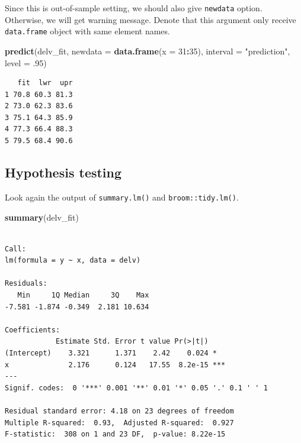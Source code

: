 \documentclass[]{book}
\newenvironment{Shaded}{\begin{snugshade}}{\end{snugshade}}
\newcommand{\DataTypeTok}[1]{\textcolor[rgb]{0.13,0.29,0.53}{#1}}
\newcommand{\DecValTok}[1]{\textcolor[rgb]{0.00,0.00,0.81}{#1}}
\newcommand{\FloatTok}[1]{\textcolor[rgb]{0.00,0.00,0.81}{#1}}
\newcommand{\KeywordTok}[1]{\textcolor[rgb]{0.13,0.29,0.53}{\textbf{#1}}}
\newcommand{\NormalTok}[1]{#1}
\newcommand{\OperatorTok}[1]{\textcolor[rgb]{0.81,0.36,0.00}{\textbf{#1}}}
\newcommand{\StringTok}[1]{\textcolor[rgb]{0.31,0.60,0.02}{#1}}
\theoremstyle{definition}
\theoremstyle{definition}
\theoremstyle{definition}
\theoremstyle{remark}
\begin{document}
Since this is out-of-sample setting, we should also give \texttt{newdata} option. Otherwise, we will get warning message. Denote that this argument only receive \texttt{data.frame} object with same element names.

\begin{Shaded}
\begin{Highlighting}[]
\KeywordTok{predict}\NormalTok{(delv_fit, }\DataTypeTok{newdata =} \KeywordTok{data.frame}\NormalTok{(}\DataTypeTok{x =} \DecValTok{31}\OperatorTok{:}\DecValTok{35}\NormalTok{), }\DataTypeTok{interval =} \StringTok{"prediction"}\NormalTok{, }\DataTypeTok{level =} \FloatTok{.95}\NormalTok{)}
\end{Highlighting}
\end{Shaded}

\begin{verbatim}
   fit  lwr  upr
1 70.8 60.3 81.3
2 73.0 62.3 83.6
3 75.1 64.3 85.9
4 77.3 66.4 88.3
5 79.5 68.4 90.6
\end{verbatim}

\hypertarget{hypothesis-testing}{%
\subsection{Hypothesis testing}\label{hypothesis-testing}}

Look again the output of \texttt{summary.lm()} and \texttt{broom::tidy.lm()}.

\begin{Shaded}
\begin{Highlighting}[]
\KeywordTok{summary}\NormalTok{(delv_fit)}
\end{Highlighting}
\end{Shaded}

\begin{verbatim}

Call:
lm(formula = y ~ x, data = delv)

Residuals:
   Min     1Q Median     3Q    Max 
-7.581 -1.874 -0.349  2.181 10.634 

Coefficients:
            Estimate Std. Error t value Pr(>|t|)    
(Intercept)    3.321      1.371    2.42    0.024 *  
x              2.176      0.124   17.55  8.2e-15 ***
---
Signif. codes:  0 '***' 0.001 '**' 0.01 '*' 0.05 '.' 0.1 ' ' 1

Residual standard error: 4.18 on 23 degrees of freedom
Multiple R-squared:  0.93,  Adjusted R-squared:  0.927 
F-statistic:  308 on 1 and 23 DF,  p-value: 8.22e-15
\end{verbatim}
\end{document}
